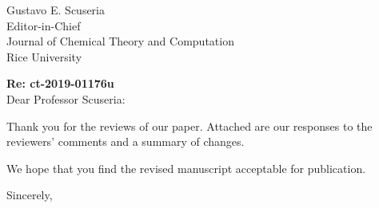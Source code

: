 \documentclass[12pt]{letter}
\begin{document}
\date{\today}


\begin{letter}{Gustavo E. Scuseria \\
    Editor-in-Chief \\
    Journal of Chemical Theory and Computation \\
    Rice University \\
    }


    \opening{\textbf{Re: ct-2019-01176u}\\[2em]
      Dear Professor Scuseria:}
\thispagestyle{uciletter}

Thank you for the reviews of our paper. Attached are our responses to
the reviewers' comments and a summary of changes.

We hope that you find the revised manuscript acceptable for publication.

\closing{Sincerely,}

\end{letter}
\end{document}
